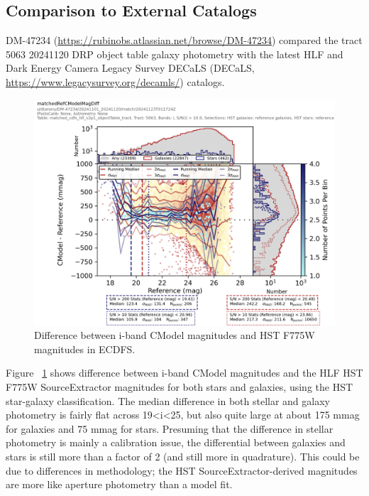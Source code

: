 \subsection{Comparison to External Catalogs}
\label{subsec:galaxy_photometry_external_catalogs}

DM-47234 (\url{https://rubinobs.atlassian.net/browse/DM-47234}) compared the tract 5063 20241120 DRP object table galaxy photometry with the latest HLF and Dark Energy Camera Legacy Survey DECaLS (DECaLS, \url{https://www.legacysurvey.org/decamls/}) catalogs.

\begin{figure}
  \label{fig:cdfs_i_vs_HST_F775W}
  \includegraphics{galaxy_photometry/cdfs_i_vs_HST_F775W.png}
  \caption{Difference between i-band CModel magnitudes and HST F775W magnitudes in ECDFS.}
\end{figure}

Figure ~\ref{fig:cdfs_i_vs_HST_F775W} shows difference between i-band CModel magnitudes and the HLF HST F775W SourceExtractor magnitudes for both stars and galaxies, using the HST star-galaxy classification.
The median difference in both stellar and galaxy photometry is fairly flat across 19<i<25, but also quite large at about 175 mmag for galaxies and 75 mmag for stars.
Presuming that the difference in stellar photometry is mainly a calibration issue, the differential between galaxies and stars is still more than a factor of 2 (and still more in quadrature).
This could be due to differences in methodology; the HST SourceExtractor-derived magnitudes are more like aperture photometry than a model fit.

